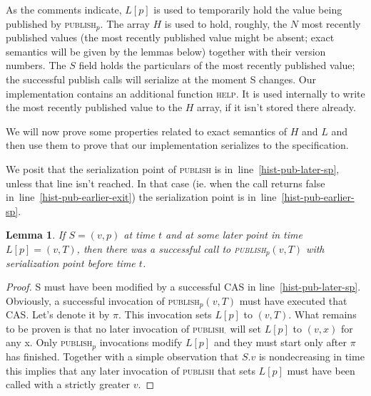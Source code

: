 \documentclass[a4paper,11pt]{article}
\newtheorem{lemma}{Lemma}
\newcommand{\fn}[1]{\textsc{#1}}
\begin{document}
As the comments indicate, $L[p]$ is used to temporarily hold the value being published by \fn{publish$_p$}. The array $H$ is used to hold, roughly,
the $N$ most recently published values (the most recently published value might be absent; exact semantics will be given by the lemmas below) together with their version numbers. The $S$ field holds the particulars of the most recently published value; the successful publish calls will serialize at the moment S changes. Our implementation contains an additional function \fn{help}. It is used internally to write the most recently published value to the $H$ array, if it isn't stored there already.

We will now prove some properties related to exact semantics of $H$ and $L$ and then use them to prove that our implementation serializes to the specification.



We posit that the serialization point of \fn{publish} is in~line~\ref{hist-pub-later-sp}, unless that line isn't reached. In that case (ie. when the call returns false in~line~\ref{hist-pub-earlier-exit})
the serialization point is in~line~\ref{hist-pub-earlier-sp}.


\begin{lemma}\label{hist-cv-latest}
If $S = (v, p)$ at time $t$ and at some later point in time $L[p] = (v, T)$, then there was a successful call to \fn{publish$_p$}$(v, T)$ with serialization point before time $t$.
\end{lemma}
\begin{proof}
S must have been modified by a successful CAS in line~\ref{hist-pub-later-sp}. Obviously, a successful invocation of \fn{publish$_p$}$(v, T)$ must have executed that CAS. Let's denote it by $\pi$.
This invocation sets $L[p]$ to $(v, T)$. What remains to be proven is that no later invocation of \fn{publish$_\cdot$} will set $L[p]$ to $(v, x)$ for any x.
Only \fn{publish$_p$} invocations modify $L[p]$ and they must start only after $\pi$ has finished. Together with a simple observation that $S.v$ is nondecreasing in time this implies
that any later invocation of \fn{publish} that sets $L[p]$ must have been called with a strictly greater $v$.
\end{proof}
\end{document}

